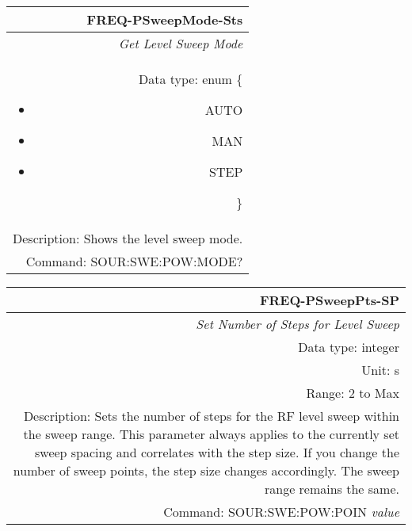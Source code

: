 \documentclass[openany]{article}
\begin{document}
		\begin{tabular}{N}
			\hline
			\bfseries FREQ-PSweepMode-Sts \\ \hline
			\emph{Get Level Sweep Mode} \\
			Data type: enum \{\begin{itemize}[noitemsep]
				\small
				\item[] AUTO
				\item[] MAN
				\item[] STEP
			\end{itemize}\} \\ 
			Description: Shows the level sweep mode. \\
			Command: SOUR:SWE:POW:MODE? \\

		\end{tabular}
%
		\begin{tabular}{N}
			\hline
			\bfseries FREQ-PSweepPts-SP \\ \hline
			\emph{Set Number of Steps for Level Sweep} \\
			Data type: integer \\
			Unit: s \\
			Range: 2 to Max \\ 
			Description: Sets the number of steps for the RF level sweep within the sweep range. This parameter always applies to the currently set sweep spacing and correlates with the step size. If you change the number of sweep points, the step size changes accordingly. The sweep range remains the same. \\
			Command: SOUR:SWE:POW:POIN \emph{value} \\
			
		\end{tabular}
\end{document}
